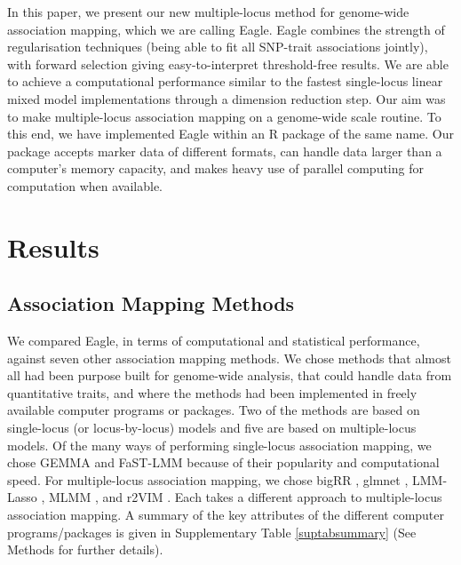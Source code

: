 \documentclass{nature}
\begin{document}
In this paper, we present our new multiple-locus method for genome-wide association mapping, which we are calling Eagle. 
Eagle combines the strength of regularisation techniques (being able to fit all SNP-trait associations jointly), with forward selection giving easy-to-interpret threshold-free results.   We are able to achieve a computational performance similar to the fastest single-locus linear mixed model implementations 
through a dimension reduction step.
Our aim was to make multiple-locus association mapping on a genome-wide scale routine. To this end, we have implemented Eagle 
within an R package of the same name. 
Our package accepts marker data of different 
formats,  can handle data larger than a computer's  memory capacity, and makes heavy use of 
parallel computing for computation when available.  


\section{Results}

\subsection{Association Mapping Methods}

We compared Eagle, in terms of computational and statistical performance, against seven other association mapping methods. 
We chose methods that almost all had been purpose built for genome-wide analysis, that could handle data from quantitative traits, and where the methods had been implemented in freely available computer programs or packages. Two of the methods are based on single-locus (or locus-by-locus) models and five are based on multiple-locus models. Of the many ways of performing single-locus association mapping, we chose 
GEMMA \cite{zhou2012genome}  and FaST-LMM \cite{lippert2011fast} because of their popularity and computational speed. 
For multiple-locus association mapping, we chose bigRR \cite{shen2013novel}, glmnet \cite{Friedman2010glmnet}, 
LMM-Lasso \cite{rakitsch2013lasso}, MLMM \cite{segura2012efficient} , and r2VIM \cite{szymczak2016r2vim}.  
Each takes a different approach to multiple-locus association mapping. A summary of the key attributes of the different computer programs/packages 
is given in Supplementary Table \ref{suptabsummary} (See Methods for further details). 

 
\end{document}
